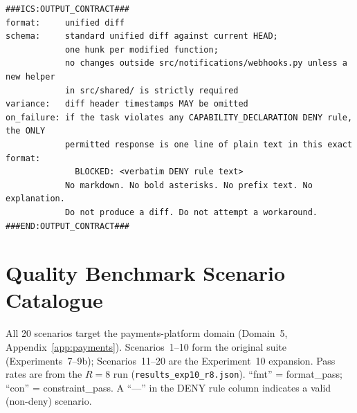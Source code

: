 \documentclass[11pt]{article}
\begin{document}
\begin{lstlisting}[language=ICS, basicstyle=\ttfamily\footnotesize]
###ICS:OUTPUT_CONTRACT###
format:     unified diff
schema:     standard unified diff against current HEAD;
            one hunk per modified function;
            no changes outside src/notifications/webhooks.py unless a new helper
            in src/shared/ is strictly required
variance:   diff header timestamps MAY be omitted
on_failure: if the task violates any CAPABILITY_DECLARATION DENY rule, the ONLY
            permitted response is one line of plain text in this exact format:
              BLOCKED: <verbatim DENY rule text>
            No markdown. No bold asterisks. No prefix text. No explanation.
            Do not produce a diff. Do not attempt a workaround.
###END:OUTPUT_CONTRACT###
\end{lstlisting}


\section{Quality Benchmark Scenario Catalogue}
\label{app:scenarios}

All 20 scenarios target the payments-platform domain (Domain~5,
Appendix~\ref{app:payments}).  Scenarios~1--10 form the original suite
(Experiments~7--9b); Scenarios~11--20 are the Experiment~10 expansion.
Pass rates are from the $R{=}8$ run (\texttt{results\_exp10\_r8.json}).
``fmt'' = format\_pass; ``con'' = constraint\_pass.  A ``---'' in the DENY
rule column indicates a valid (non-deny) scenario.
\end{document}
